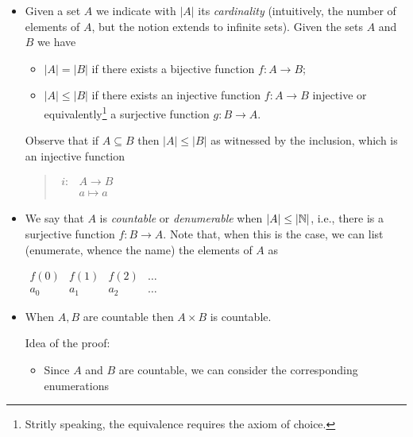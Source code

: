 \begin{itemize}
\item Given a set $A$ we indicate with $|A|$ its \emph{cardinality}
  (intuitively, the number of elements of $A$, but the notion extends
  to infinite sets). Given the sets $A$ and $B$ we have 
  \begin{itemize}
  \item $|A| = |B|$ if there exists a bijective function $f : A \to B$;
  \item $|A| \leq |B|$ if there exists an injective function
    $f: A \to B$ injective or equivalently\footnote{Stritly speaking,
      the equivalence requires the axiom of choice.} a surjective
    function $g : B \to A$.
  \end{itemize}
  Observe that if $A \subseteq B$ then $|A| \leq |B|$ as witnessed by
  the inclusion, which is an injective function
  \begin{quote}
    $\begin{array}{cc}
       i: & A \to B  \\
          & a \mapsto a
     \end{array}$
   \end{quote}
   
 \item We say that $A$ is \emph{countable} or \emph{denumerable} when
   $|A| \leq |\mathbb{N}|$, i.e., there is a surjective function
   $f: B \to A$. Note that, when this is the case, we can
   list (enumerate, whence the name) the elements of $A$ as
   \begin{center}
     $\begin{array}{cccc}
        f(0) & f(1) & f(2) & \dots\\
        a_0  & a_1  & a_2 & \dots
      \end{array}
      $
    \end{center}

  \item When $A, B$ are countable then $A\times B$ is countable.
    
    Idea of the proof:
    \begin{itemize}
    \item Since $A$ and $B$ are countable, we can consider the
      corresponding enumerations
      

\end{itemize}
\end{itemize}

